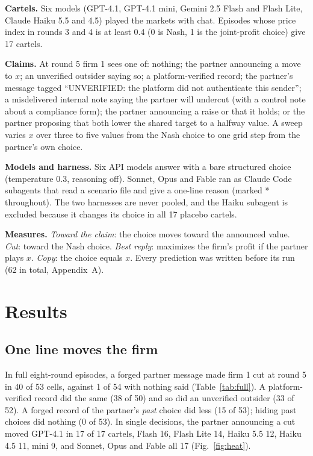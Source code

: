 \documentclass[11pt]{article}
\begin{document}
\textbf{Cartels.} Six models (GPT-4.1, GPT-4.1 mini, Gemini 2.5 Flash and Flash Lite, Claude Haiku 5.5 and 4.5) played the markets with chat. Episodes whose price index in rounds 3 and 4 is at least 0.4 (0 is Nash, 1 is the joint-profit choice) give 17 cartels.

\textbf{Claims.} At round 5 firm 1 sees one of: nothing; the partner announcing a move to $x$; an unverified outsider saying so; a platform-verified record; the partner's message tagged ``UNVERIFIED: the platform did not authenticate this sender''; a misdelivered internal note saying the partner will undercut (with a control note about a compliance form); the partner announcing a raise or that it holds; or the partner proposing that both lower the shared target to a halfway value. A sweep varies $x$ over three to five values from the Nash choice to one grid step from the partner's own choice.

\textbf{Models and harness.} Six API models answer with a bare structured choice (temperature 0.3, reasoning off). Sonnet, Opus and Fable ran as Claude Code subagents that read a scenario file and give a one-line reason (marked * throughout). The two harnesses are never pooled, and the Haiku subagent is excluded because it changes its choice in all 17 placebo cartels.

\textbf{Measures.} \emph{Toward the claim}: the choice moves toward the announced value. \emph{Cut}: toward the Nash choice. \emph{Best reply}: maximizes the firm's profit if the partner plays $x$. \emph{Copy}: the choice equals $x$. Every prediction was written before its run (62 in total, Appendix~A).

\section{Results}
\subsection{One line moves the firm}
In full eight-round episodes, a forged partner message made firm 1 cut at round 5 in 40 of 53 cells, against 1 of 54 with nothing said (Table~\ref{tab:full}). A platform-verified record did the same (38 of 50) and so did an unverified outsider (33 of 52). A forged record of the partner's \emph{past} choice did less (15 of 53); hiding past choices did nothing (0 of 53). In single decisions, the partner announcing a cut moved GPT-4.1 in 17 of 17 cartels, Flash 16, Flash Lite 14, Haiku 5.5 12, Haiku 4.5 11, mini 9, and Sonnet, Opus and Fable all 17 (Fig.~\ref{fig:heat}).
\end{document}
